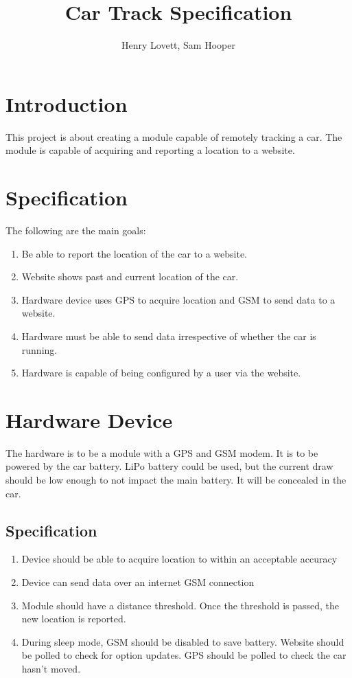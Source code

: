 \documentclass[12pt]{article}
\author{Henry Lovett, Sam Hooper}
\title{Car Track Specification}
\begin{document}
\maketitle


\section{Introduction}

This project is about creating a module capable of remotely tracking a car. 
The module is capable of acquiring and reporting a location to a website. 

\section{Specification}
The following are the main goals:

\begin{enumerate}
\item Be able to report the location of the car to a website. 
\item Website shows past and current location of the car.
\item Hardware device uses GPS to acquire location and GSM to send data to a website.
\item Hardware must be able to send data irrespective of whether the car is running.
\item Hardware is capable of being configured by a user via the website.
\end{enumerate}

\section{Hardware Device}

The hardware is to be a module with a GPS and GSM modem. 
It is to be powered by the car battery. 
LiPo battery could be used, but the current draw should be low enough to not impact the main battery. 
It will be concealed in the car.

\subsection{Specification}

\begin{enumerate}
\item Device should be able to acquire location to within an acceptable accuracy
\item Device can send data over an internet GSM connection
\item Module should have a distance threshold. Once the threshold is passed, the new location is reported.
\item During sleep mode, GSM should be disabled to save battery. Website should be polled to check for option updates. GPS should be polled to check the car hasn't moved.
\end{enumerate}
\end{document}
